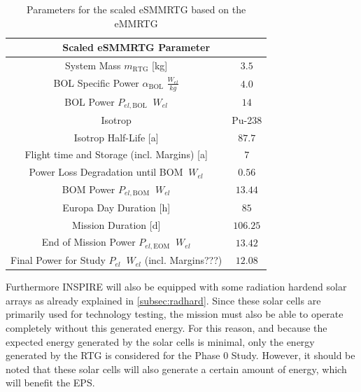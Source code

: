 \begin{table}[H]
\centering
\begin{tabular}{|c|c|}
\hline
\multicolumn{2}{|c|}{Scaled eSMMRTG Parameter}                \\ \hline
System Mass $m_\text{RTG}$ [kg]                             & $3.5$     \\ \hline
BOL Specific Power $\alpha_\text{BOL}$ $\frac{W_{el}}{kg}$  & $4.0$     \\ \hline
BOL Power $P_{el,\text{BOL}}$ $\ W_{el}$                    & $14$       \\ \hline
Isotrop                                                     & Pu-238   \\ \hline
Isotrop Half-Life [a]                                       & $87.7$     \\ \hline
Flight time and Storage (incl. Margins) [a]                 & $7$        \\ \hline
Power Loss Degradation until BOM $\ W_{el}$                 & $0.56$     \\ \hline
BOM Power $P_{el,\text{BOM}}$ $\ W_{el}$                    & $13.44$    \\ \hline
Europa Day Duration [h]                                     & $85$       \\ \hline
Mission Duration [d]                                        & $106.25$   \\ \hline
End of Mission Power $P_{el,\text{EOM}}$ $\ W_{el}$         & $13.42$   \\ \hline
Final Power for Study $P_{el}$ $\ W_{el}$ (incl. Margins???) & $12.08$    \\ \hline

\end{tabular}
\caption{Parameters for the scaled eSMMRTG based on the eMMRTG}
\label{tab:esmmrtg}
\end{table}

Furthermore INSPIRE will also be equipped with some radiation hardend solar arrays as already explained in \autoref{subsec:radhard}. Since these solar cells are primarily used for technology testing, the mission must also be able to operate completely without this generated energy. For this reason, and because the expected energy generated by the solar cells is minimal, only the energy generated by the RTG is considered for the Phase 0 Study. However, it should be noted that these solar cells will also generate a certain amount of energy, which will benefit the EPS.


